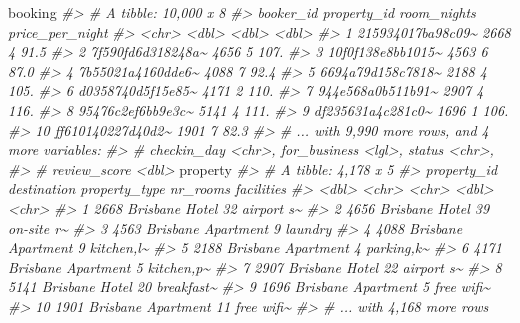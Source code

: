 \documentclass[
]{book}
\newenvironment{Shaded}{\begin{snugshade}}{\end{snugshade}}
\newcommand{\CommentTok}[1]{\textcolor[rgb]{0.56,0.35,0.01}{\textit{#1}}}
\newcommand{\NormalTok}[1]{#1}
\begin{document}
\begin{Shaded}
\begin{Highlighting}[]
\NormalTok{booking}
\CommentTok{\#\textgreater{} \# A tibble: 10,000 x 8}
\CommentTok{\#\textgreater{}    booker\_id         property\_id room\_nights price\_per\_night}
\CommentTok{\#\textgreater{}    \textless{}chr\textgreater{}                   \textless{}dbl\textgreater{}       \textless{}dbl\textgreater{}           \textless{}dbl\textgreater{}}
\CommentTok{\#\textgreater{}  1 215934017ba98c09\textasciitilde{}        2668           4            91.5}
\CommentTok{\#\textgreater{}  2 7f590fd6d318248a\textasciitilde{}        4656           5           107. }
\CommentTok{\#\textgreater{}  3 10f0f138e8bb1015\textasciitilde{}        4563           6            87.0}
\CommentTok{\#\textgreater{}  4 7b55021a4160dde6\textasciitilde{}        4088           7            92.4}
\CommentTok{\#\textgreater{}  5 6694a79d158c7818\textasciitilde{}        2188           4           105. }
\CommentTok{\#\textgreater{}  6 d0358740d5f15e85\textasciitilde{}        4171           2           110. }
\CommentTok{\#\textgreater{}  7 944e568a0b511b91\textasciitilde{}        2907           4           116. }
\CommentTok{\#\textgreater{}  8 95476c2ef6bb9e3c\textasciitilde{}        5141           4           111. }
\CommentTok{\#\textgreater{}  9 df235631a4c281c0\textasciitilde{}        1696           1           106. }
\CommentTok{\#\textgreater{} 10 ff610140227d40d2\textasciitilde{}        1901           7            82.3}
\CommentTok{\#\textgreater{} \# ... with 9,990 more rows, and 4 more variables:}
\CommentTok{\#\textgreater{} \#   checkin\_day \textless{}chr\textgreater{}, for\_business \textless{}lgl\textgreater{}, status \textless{}chr\textgreater{},}
\CommentTok{\#\textgreater{} \#   review\_score \textless{}dbl\textgreater{}}
\NormalTok{property}
\CommentTok{\#\textgreater{} \# A tibble: 4,178 x 5}
\CommentTok{\#\textgreater{}    property\_id destination property\_type nr\_rooms facilities}
\CommentTok{\#\textgreater{}          \textless{}dbl\textgreater{} \textless{}chr\textgreater{}       \textless{}chr\textgreater{}            \textless{}dbl\textgreater{} \textless{}chr\textgreater{}     }
\CommentTok{\#\textgreater{}  1        2668 Brisbane    Hotel               32 airport s\textasciitilde{}}
\CommentTok{\#\textgreater{}  2        4656 Brisbane    Hotel               39 on{-}site r\textasciitilde{}}
\CommentTok{\#\textgreater{}  3        4563 Brisbane    Apartment            9 laundry   }
\CommentTok{\#\textgreater{}  4        4088 Brisbane    Apartment            9 kitchen,l\textasciitilde{}}
\CommentTok{\#\textgreater{}  5        2188 Brisbane    Apartment            4 parking,k\textasciitilde{}}
\CommentTok{\#\textgreater{}  6        4171 Brisbane    Apartment            5 kitchen,p\textasciitilde{}}
\CommentTok{\#\textgreater{}  7        2907 Brisbane    Hotel               22 airport s\textasciitilde{}}
\CommentTok{\#\textgreater{}  8        5141 Brisbane    Hotel               20 breakfast\textasciitilde{}}
\CommentTok{\#\textgreater{}  9        1696 Brisbane    Apartment            5 free wifi\textasciitilde{}}
\CommentTok{\#\textgreater{} 10        1901 Brisbane    Apartment           11 free wifi\textasciitilde{}}
\CommentTok{\#\textgreater{} \# ... with 4,168 more rows}


\end{Highlighting}
\end{Shaded}
\end{document}
